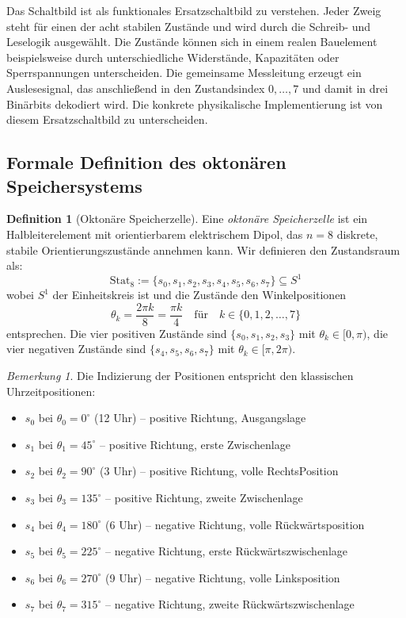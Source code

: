 \documentclass[12pt, a4paper]{article}
\theoremstyle{definition}
\newtheorem{definition}[theorem]{Definition}
\theoremstyle{remark}
\newtheorem{remark}[theorem]{Bemerkung}
\newcommand{\Stat}{\mathrm{Stat}}
\begin{document}
Das Schaltbild ist als funktionales Ersatzschaltbild zu verstehen. Jeder
Zweig steht für einen der acht stabilen Zustände und wird durch die
Schreib- und Leselogik ausgewählt. Die Zustände können sich in einem realen
Bauelement beispielsweise durch unterschiedliche Widerstände, Kapazitäten
oder Sperrspannungen unterscheiden. Die gemeinsame Messleitung erzeugt ein
Auslesesignal, das anschließend in den Zustandsindex $0,\ldots,7$ und damit
in drei Binärbits dekodiert wird. Die konkrete physikalische Implementierung
ist von diesem Ersatzschaltbild zu unterscheiden.

\subsection{Formale Definition des oktonären Speichersystems}
\label{subsec:definition_oktonaer}

\begin{definition}[Oktonäre Speicherzelle]
\label{def:oktonaere_speicherzelle}
Eine \emph{oktonäre Speicherzelle} ist ein Halbleiterelement mit orientierbarem elektrischem Dipol, das $n = 8$ diskrete, stabile Orientierungszustände annehmen kann. Wir definieren den Zustandsraum als:
\[
\Stat_8 := \{s_0, s_1, s_2, s_3, s_4, s_5, s_6, s_7\} \subseteq S^1
\]
wobei $S^1$ der Einheitskreis ist und die Zustände den Winkelpositionen
\[
\theta_k = \frac{2\pi k}{8} = \frac{\pi k}{4} \quad \text{für} \quad k \in \{0,1,2,\ldots,7\}
\]
entsprechen. Die vier positiven Zustände sind $\{s_0, s_1, s_2, s_3\}$ mit $\theta_k \in [0, \pi)$, die vier negativen Zustände sind $\{s_4, s_5, s_6, s_7\}$ mit $\theta_k \in [\pi, 2\pi)$.
\end{definition}

\begin{remark}
Die Indizierung der Positionen entspricht den klassischen Uhrzeitpositionen:
\begin{itemize}
  \item $s_0$ bei $\theta_0 = 0^\circ$ (12 Uhr) -- positive Richtung, Ausgangslage
  \item $s_1$ bei $\theta_1 = 45^\circ$ -- positive Richtung, erste Zwischenlage
  \item $s_2$ bei $\theta_2 = 90^\circ$ (3 Uhr) -- positive Richtung, volle RechtsPosition
  \item $s_3$ bei $\theta_3 = 135^\circ$ -- positive Richtung, zweite Zwischenlage
  \item $s_4$ bei $\theta_4 = 180^\circ$ (6 Uhr) -- negative Richtung, volle Rückwärtsposition
  \item $s_5$ bei $\theta_5 = 225^\circ$ -- negative Richtung, erste Rückwärtszwischenlage
  \item $s_6$ bei $\theta_6 = 270^\circ$ (9 Uhr) -- negative Richtung, volle Linksposition
  \item $s_7$ bei $\theta_7 = 315^\circ$ -- negative Richtung, zweite Rückwärtszwischenlage
\end{itemize}
\end{remark}
\end{document}
